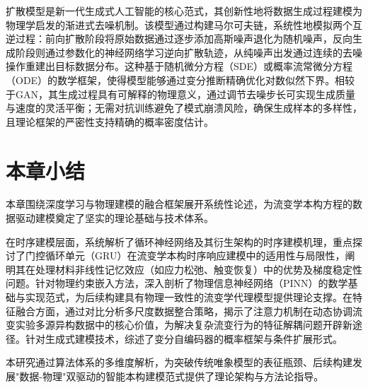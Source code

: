 扩散模型是新一代生成式人工智能的核心范式，其创新性地将数据生成过程建模为物理学启发的渐进式去噪机制\cite{ho2020denoising}。该模型通过构建马尔可夫链，系统性地模拟两个互逆过程：前向扩散阶段将原始数据通过逐步添加高斯噪声退化为随机噪声，反向生成阶段则通过参数化的神经网络学习逆向扩散轨迹，从纯噪声出发通过连续的去噪操作重建出目标数据分布。这种基于随机微分方程（SDE）或概率流常微分方程（ODE）的数学框架，使得模型能够通过变分推断精确优化对数似然下界\cite{song2020score}。相较于GAN，其生成过程具有可解释的物理意义，通过调节去噪步长可实现生成质量与速度的灵活平衡；无需对抗训练避免了模式崩溃风险，确保生成样本的多样性，且理论框架的严密性支持精确的概率密度估计\cite{Cao2024Survey}。
\section{本章小结}
本章围绕深度学习与物理建模的融合框架展开系统性论述，为流变学本构方程的数据驱动建模奠定了坚实的理论基础与技术体系。

在时序建模层面，系统解析了循环神经网络及其衍生架构的时序建模机理，重点探讨了门控循环单元（GRU）在流变学本构时序响应建模中的适用性与局限性，阐明其在处理材料非线性记忆效应（如应力松弛、触变恢复）中的优势及梯度稳定性问题。针对物理约束嵌入方法，深入剖析了物理信息神经网络（PINN）的数学基础与实现范式，为后续构建具有物理一致性的流变学代理模型提供理论支撑。在特征融合方面，通过对比分析多尺度数据整合策略，揭示了注意力机制在动态协调流变实验多源异构数据中的核心价值，为解决复杂流变行为的特征解耦问题开辟新途径。针对生成式建模技术，综述了变分自编码器的概率框架与条件扩展形式。

本研究通过算法体系的多维度解析，为突破传统唯象模型的表征瓶颈、后续构建发展"数据-物理"双驱动的智能本构建模范式提供了理论架构与方法论指导。